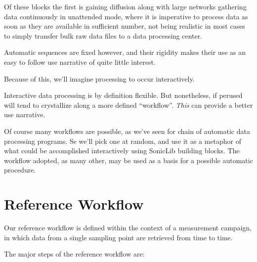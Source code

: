 \documentclass[a4paper,10pt]{book}
\begin{document}
Of these blocks the first is gaining diffusion along with large networks gathering data continuously in unattended mode, where it is imperative to process data as soon as they are available in sufficient number, not being realistic in most cases to simply transfer bulk raw data files to a data processing center.

Automatic sequences are fixed however, and their rigidity makes their use as an easy to follow use narrative of quite little interest.

Because of this, we'll imagine processing to occur interactively.

Interactive data processing is by definition flexible. But nonetheless, if perused will tend to crystallize along a more defined ``workflow''. \emph{This} can provide a better use narrative.

Of course many workflows are possible, as we've seen for chain of automatic data processing programs. Se we'll pick one at random, and use it as a metaphor of what could be accomplished interactively using SonicLib building blocks. The workflow adopted, as many other, may be used as a basis for a possible automatic procedure.

\section{Reference Workflow}
\label{sec:Reference workflow}

Our reference workflow is defined within the context of a measurement campaign, in which data from a single sampling point are retrieved from time to time.

The major steps of the reference workflow are:
\end{document}
